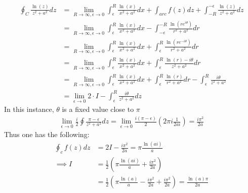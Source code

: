 \documentclass{article}
\begin{document}
\begin{align*}
    \oint_C \frac{\ln(z)}{z^2 + a^2}dz &= \lim_{R\to\infty,\epsilon\to0}\int_\epsilon^R \frac{\ln(x)}{x^2 + a^2}dx + \int_{arc}f(z)dz + \int_{-R}^{-\epsilon}\frac{\ln(z)}{z^2 + a^2}dz\\
    &= \lim_{R\to\infty,\epsilon\to0}\int_\epsilon^R \frac{\ln(x)}{x^2 + a^2}dx - \int_{-\epsilon}^{-R}\frac{\ln(r e^{i\theta})}{r^2 + a^2}dr\\
    &= \lim_{R\to\infty,\epsilon\to0}\int_\epsilon^R \frac{\ln(x)}{x^2 + a^2}dx + \int_{\epsilon}^{R}\frac{\ln(r e^{-i\theta})}{r^2 + a^2}dr\\
    &= \lim_{R\to\infty,\epsilon\to0}\int_\epsilon^R \frac{\ln(x)}{x^2 + a^2}dx + \int_{\epsilon}^{R}\frac{\ln(r)-i\theta}{z^2 + a^2}dr\\
    &= \lim_{R\to\infty,\epsilon\to0}\int_\epsilon^R \frac{\ln(x)}{x^2 + a^2}dx + \int_{\epsilon}^{R}\frac{\ln(r)}{r^2 + a^2}dr - \int_\epsilon^R \frac{i\theta}{z^2 + a^2}\\
    &= \lim_{\epsilon\to0}2\cdot I - \int_\epsilon^R\frac{i\theta}{z^2 + a^2}dz
\end{align*}In this instance, $\theta$ is a fixed value close to $\pi$
\begin{align*}
    \lim_{\epsilon\to0} \frac{i}{2}\oint\frac{\pi - \epsilon}{z^2 + a^2}dz =\lim_{\epsilon\to0} \frac{i(\pi - \epsilon)}{2}\left(2\pi i\frac{1}{2ai}\right) = \frac{i\pi^2}{2a}
\end{align*}Thus one has the following:
\begin{align*}
    \oint_c f(z)dz &= 2 I - \frac{i\pi^2}{2a} = \pi\frac{\ln(ai)}{a}\\
    \implies I &= \frac{1}{2}\left(\pi\frac{\ln(ai)}{a} + \frac{i\pi^2}{2a}\right)\\
    &= \frac{1}{2}\left(\pi\frac{\ln(a)}{a} - \frac{i\pi^2}{2a} + \frac{i\pi^2}{2a}\right)=\frac{\ln(a)\pi}{2a}
\end{align*}

\end{document}
